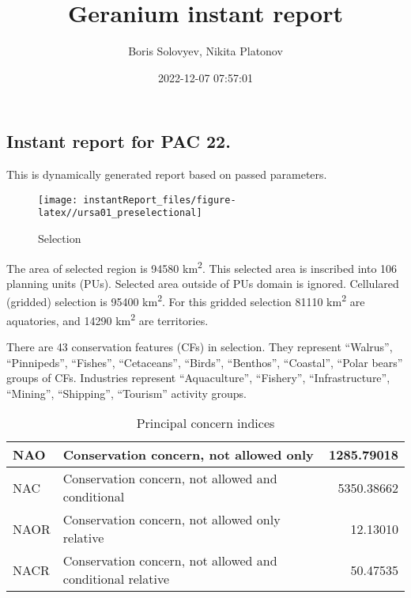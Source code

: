 \documentclass[
]{article}
\title{Geranium instant report}
\author{Boris Solovyev, Nikita Platonov}
\date{2022-12-07 07:57:01}
\begin{document}
\maketitle

\hypertarget{instant-report-for-pac-22.}{%
\subsection{Instant report for PAC 22.}\label{instant-report-for-pac-22.}}

This is dynamically generated report based on passed parameters.

\begin{figure}

{\centering \texttt{[image: instantReport\_files/figure-latex//ursa01\_preselectional]} 

}

\caption{Selection}\label{fig:selectional}
\end{figure}

The area of selected region is 94580 km\textsuperscript{2}.
This selected area is inscribed into 106 planning units (PUs).
Selected area outside of PUs domain is ignored.
Cellulared (gridded) selection is 95400 km\textsuperscript{2}.
For this gridded selection 81110 km\textsuperscript{2} are aquatories,
and 14290 km\textsuperscript{2} are territories.

There are 43 conservation features (CFs) in selection.
They represent ``Walrus'', ``Pinnipeds'', ``Fishes'', ``Cetaceans'', ``Birds'', ``Benthos'', ``Coastal'', ``Polar bears'' groups of CFs.
Industries represent ``Aquaculture'', ``Fishery'', ``Infrastructure'', ``Mining'', ``Shipping'', ``Tourism'' activity groups.

\begin{table}

\caption{\label{tab:principal}Principal concern indices}
\centering
\begin{tabular}[t]{l|l|r}
\hline
NAO & Conservation concern, not allowed only & 1285.79018\\
\hline
NAC & Conservation concern, not allowed and conditional & 5350.38662\\
\hline
NAOR & Conservation concern, not allowed only relative & 12.13010\\
\hline
NACR & Conservation concern, not allowed and conditional relative & 50.47535\\
\hline
\end{tabular}
\end{table}
\end{document}
